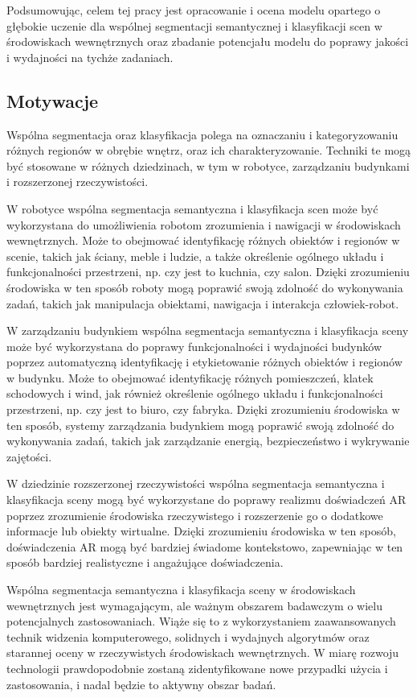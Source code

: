Podsumowując, celem tej pracy jest opracowanie i ocena modelu opartego o głębokie uczenie dla wspólnej segmentacji semantycznej i klasyfikacji scen w środowiskach wewnętrznych oraz zbadanie potencjału modelu do poprawy jakości i wydajności na tychże zadaniach.

\subsection{Motywacje}
Wspólna segmentacja oraz klasyfikacja polega na oznaczaniu i kategoryzowaniu różnych regionów w obrębie wnętrz, oraz ich charakteryzowanie. Techniki te mogą być stosowane w różnych dziedzinach, w tym w robotyce, zarządzaniu budynkami i rozszerzonej rzeczywistości.

W robotyce wspólna segmentacja semantyczna i klasyfikacja scen może być wykorzystana do umożliwienia robotom zrozumienia i nawigacji w środowiskach wewnętrznych. Może to obejmować identyfikację różnych obiektów i regionów w scenie, takich jak ściany, meble i ludzie, a także określenie ogólnego układu i funkcjonalności przestrzeni, np. czy jest to kuchnia, czy salon. Dzięki zrozumieniu środowiska w ten sposób roboty mogą poprawić swoją zdolność do wykonywania zadań, takich jak manipulacja obiektami, nawigacja i interakcja człowiek-robot.

W zarządzaniu budynkiem wspólna segmentacja semantyczna i klasyfikacja sceny może być wykorzystana do poprawy funkcjonalności i wydajności budynków poprzez automatyczną identyfikację i etykietowanie różnych obiektów i regionów w budynku. Może to obejmować identyfikację różnych pomieszczeń, klatek schodowych i wind, jak również określenie ogólnego układu i funkcjonalności przestrzeni, np. czy jest to biuro, czy fabryka. Dzięki zrozumieniu środowiska w ten sposób, systemy zarządzania budynkiem mogą poprawić swoją zdolność do wykonywania zadań, takich jak zarządzanie energią, bezpieczeństwo i wykrywanie zajętości.

W dziedzinie rozszerzonej rzeczywistości wspólna segmentacja semantyczna i klasyfikacja sceny mogą być wykorzystane do poprawy realizmu doświadczeń AR poprzez zrozumienie środowiska rzeczywistego i rozszerzenie go o dodatkowe informacje lub obiekty wirtualne. Dzięki zrozumieniu środowiska w ten sposób, doświadczenia AR mogą być bardziej świadome kontekstowo, zapewniając w ten sposób bardziej realistyczne i angażujące doświadczenia.

Wspólna segmentacja semantyczna i klasyfikacja sceny w środowiskach wewnętrznych jest wymagającym, ale ważnym obszarem badawczym o wielu potencjalnych zastosowaniach. Wiąże się to z wykorzystaniem zaawansowanych technik widzenia komputerowego, solidnych i wydajnych algorytmów oraz starannej oceny w rzeczywistych środowiskach wewnętrznych. W miarę rozwoju technologii prawdopodobnie zostaną zidentyfikowane nowe przypadki użycia i zastosowania, i nadal będzie to aktywny obszar badań.
